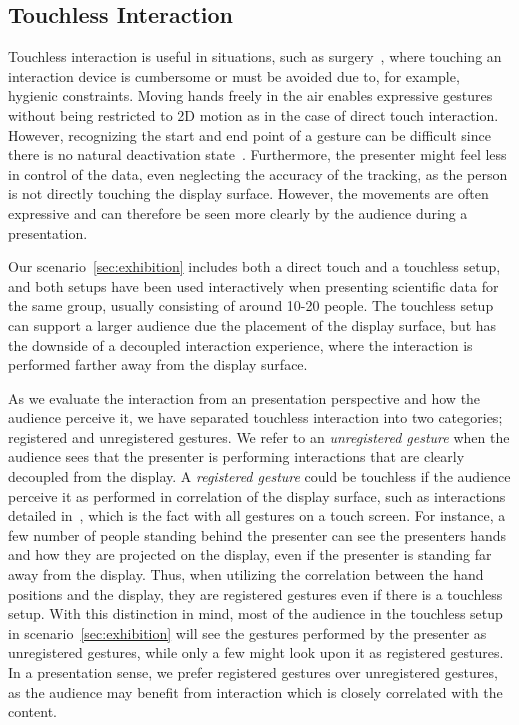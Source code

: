 \documentclass[review,journal]{vgtc}         %
\begin{document}
\subsection{Touchless Interaction}\label{subsec:touchless}
Touchless interaction is useful in situations, such as surgery~\cite{Mentis:2012:IPI:2207676.2208536}, where touching an interaction device is cumbersome or must be avoided due to, for example, hygienic constraints.
Moving hands freely in the air enables expressive gestures without being restricted to 2D motion as in the case of direct touch interaction.
However, recognizing the start and end point of a gesture can be difficult since there is no natural deactivation state~\cite{Kirmizibayrak:2011:EGB:2087756.2087764}.
Furthermore, the presenter might feel less in control of the data, even neglecting the accuracy of the tracking, as the person is not directly touching the display surface.
However, the movements are often expressive and can therefore be seen more clearly by the audience during a presentation.

Our scenario~\ref{sec:exhibition} includes both a direct touch and a touchless setup, and both setups have been used interactively when presenting scientific data for the same group, usually consisting of around 10-20 people.
The touchless setup can support a larger audience due the placement of the display surface, but has the downside of a decoupled interaction experience, where the interaction is performed farther away from the display surface.

As we evaluate the interaction from an presentation perspective and how the audience perceive it, we have separated touchless interaction into two categories; registered and unregistered gestures.
We refer to an \emph{unregistered gesture} when the audience sees that the presenter is performing interactions that are clearly decoupled from the display. 
A \emph{registered gesture} could be touchless if the audience perceive it as performed in correlation of the display surface, such as interactions detailed in~\cite{Bezerianos:2007:DSU:1467769}, which is the fact with all gestures on a touch screen. 
For instance, a few number of people standing behind the presenter can see the presenters hands and how they are projected on the display, even if the presenter is standing far away from the display.
Thus, when utilizing the correlation between the hand positions and the display, they are registered gestures even if there is a touchless setup.
With this distinction in mind, most of the audience in the touchless setup in scenario~\ref{sec:exhibition} will see the gestures performed by the presenter as unregistered gestures, while only a few might look upon it as registered gestures.
In a presentation sense, we prefer registered gestures over unregistered gestures, as the audience may benefit from interaction which is closely correlated with the content.
 
\end{document}
